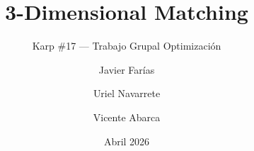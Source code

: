 \documentclass[aspectratio=169]{beamer}
\title{3-Dimensional Matching}
\subtitle{Karp \#17 --- Trabajo Grupal Optimizaci\'on}
\author{Javier Far\'ias \and Uriel Navarrete \and Vicente Abarca}
\institute{Universidad Andr\'es Bello}
\date{Abril 2026}
\begin{document}
\begin{frame}
  \titlepage
\end{frame}









\end{document}
